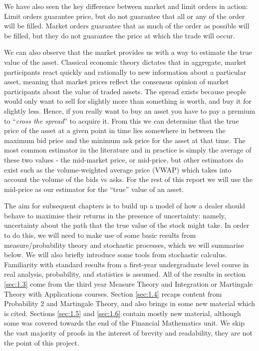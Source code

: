 We have also seen the key difference between market and limit orders in action: Limit 
orders guarantee price, but do not guarantee that all or any of the order will be 
filled. Market orders guarantee that as much of the order as possible will be filled, 
but they do not guarantee the price at which the trade will occur.

We can also observe that the market provides us with a way to estimate the true value 
of the asset. Classical economic theory dictates that in aggregate, market participants 
react quickly and rationally to new information about a particular asset, meaning that 
market prices reflect the consensus opinion of market participants about the value of 
traded assets. The spread exists because people would only want to sell for slightly 
more than something is worth, and buy it for slightly less. Hence, if you really want 
to buy an asset you have to pay a premium to ``\textit{cross the spread}'' to acquire 
it. From this we can determine that the true price of the asset at a given point in time 
lies somewhere in between the maximum bid price and the minimum ask price for the asset 
at that time. The most common estimator in the literature and in practice is simply 
the average of these two values - the mid-market price, or mid-price, but other estimators do exist 
such as the volume-weighted average price (VWAP) which takes into account the volume 
of the bids vs asks. For the rest of this report we will use the mid-price as our 
estimator for the ``true'' value of an asset.

The aim for subsequent chapters is to build up a model of how a dealer should 
behave to maximise their returns in the presence of uncertainty: namely, uncertainty 
about the path that the true value of the stock might take. In order to do this, we 
will need to make use of some basic results from measure/probability theory and 
stochastic processes, which we will summarise below. We will also briefly introduce 
some tools from stochastic calculus. Familiarity with standard results from a 
first-year undergraduate level course in real analysis, probability, and statistics 
is assumed. All of the results in section \ref{sec:1.3} come from the third year
Measure Theory and Integration or Martingale Theory with Applications courses. Section
\ref{sec:1.4} recaps content from Probability 2 and Martingale Theory, and also brings
in some new material which is cited. Sections \ref{sec:1.5} and \ref{sec:1.6} contain 
mostly new material, although some was covered towards the end of the Financial 
Mathematics unit. We skip the vast majority of proofs in the interest of brevity 
and readability, they are not the point of this project. 

